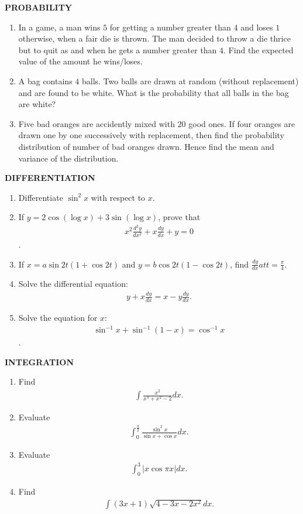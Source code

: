 \documentclass[12pt,-letter paper]{article}
\begin{document}
\begin{center}
	\textbf{PROBABILITY}
\end{center}
\begin{enumerate}
\item In a game, a man wins \rupee$5$ for getting a number greater than $4$ and loses \rupee$1$ otherwise, when a fair die is thrown. The man decided to throw a die thrice but to quit as and when he gets a number greater than $4$. Find the expected value of the amount he wins/loses. 
\item A bag contains $4$ balls. Two balls are drawn at random (without replacement) and are found to be white. What is the probability that all balls in the bag are white?
\item Five bad oranges are accidently mixed with $20$ good ones. If four oranges are drawn one by one successively with replacement, then find the probability distribution of number of bad oranges drawn. Hence find the mean and variance of the distribution.
\end{enumerate}
\begin{center}
	\textbf{DIFFERENTIATION}
\end{center}
\begin{enumerate}
\item Differentiate $\sin^2 x$ with respect to $x$. 
\item If  $y=2\cos(\log x)+3\sin(\log x)$, prove that \begin{align}x^2\frac{d^2y}{dx^2}+x\frac{dy}{dx}+y=0\end{align}. 
\item If $x=a\sin 2t(1+\cos 2t)$ and $y=b\cos 2t(1-\cos 2t)$, find $\frac{dy}{dx} at t=\frac{\pi}{4}$.
\item Solve the differential equation:
\begin{align}y+x\frac{dy}{dx}=x-y\frac{dy}{dx}.\end{align}


\item Solve the equation for $x$:
\begin{align}\sin^{-1}x+\sin^{-1}(1-x)=\cos^{-1}x\end{align}.
\end{enumerate}
\begin{center}
	\textbf{INTEGRATION}
\end{center}
\begin{enumerate}
\item Find 
\begin{align}\int\frac{x^2}{x^4+x^2-2}dx.\end{align} 
\item Evaluate 
\begin{align}\int_{0}^{\frac{\pi}{2}}\frac{\sin^2x}{\sin x+\cos x}dx.\end{align} 

\item Evaluate 
\begin{align}\int_{0}^{3}|x\cos \pi x|dx.\end{align} 
\item Find
\begin{align}\int(3x+1)\sqrt{4-3x-2x^2}dx.\end{align}
\end{enumerate}
\end{document}
